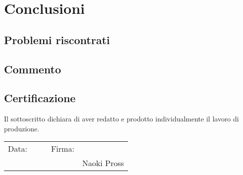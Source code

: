 \chapter{Conclusioni}
\section{Problemi riscontrati}
\section{Commento}
\section{Certificazione}
Il sottoscritto dichiara di aver redatto e prodotto individualmente il lavoro
di produzione.
\begin{flushright}
\begin{tabular}{ r p{5cm} p{1cm} r p{5cm}}
    Data: & \hrulefill && Firma: & \hrulefill \\
    &&&& Naoki Pross \\
\end{tabular}
\end{flushright}
